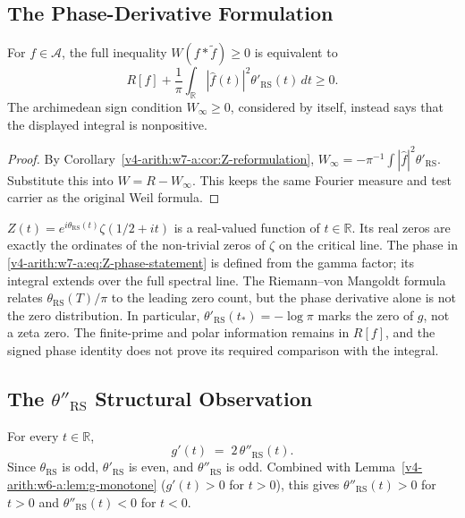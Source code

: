 \subsection{The Phase-Derivative Formulation}
\label{v4-arith:w7-a:Z-reformulation:phase}
\begin{theorem}
\label{v4-arith:w7-a:thm:Z-phase-reformulation}
For \(f\in\mathscr A\), the full inequality
\(W(f*\widetilde f)\ge0\) is equivalent to
\begin{equation}
\label{v4-arith:w7-a:eq:Z-phase-statement}
 R[f]+\frac1\pi\int_{\mathbb R}|\widehat f(t)|^2
          \theta'_{\mathrm{RS}}(t)\,dt\ge0.
\end{equation}
The archimedean sign condition \(W_\infty\ge0\), considered by
itself, instead says that the displayed integral is nonpositive.
\end{theorem}
\begin{proof}
By Corollary~\ref{v4-arith:w7-a:cor:Z-reformulation},
\(W_\infty=-\pi^{-1}\int|\widehat f|^2\theta'_{\mathrm{RS}}\).
Substitute this into \(W=R-W_\infty\). This keeps the same Fourier
measure and test carrier as the original Weil formula.
\end{proof}

\begin{remark}
\label{v4-arith:w7-a:rem:Z-zeros}
\(Z(t)=e^{i\theta_{\mathrm{RS}}(t)}\zeta(1/2+it)\) is a real-valued
function of \(t\in\mathbb{R}\). Its real zeros are exactly the
ordinates of the non-trivial zeros of \(\zeta\) on the critical line.
The phase in \eqref{v4-arith:w7-a:eq:Z-phase-statement} is defined
from the gamma factor; its integral extends over the full spectral
line. The Riemann--von Mangoldt formula relates
\(\theta_{\mathrm{RS}}(T)/\pi\) to the leading zero count, but the
phase derivative alone is not the zero distribution. In particular,
\(\theta'_{\mathrm{RS}}(t_*)=-\log\pi\) marks the zero of \(g\),
not a zeta zero. The finite-prime and polar information remains in
\(R[f]\), and the signed phase identity does not prove its required
comparison with the integral.
\end{remark}

\subsection{The \(\theta''_{\mathrm{RS}}\) Structural Observation}
\label{v4-arith:w7-a:Z-reformulation:theta-second-deriv}

\begin{proposition}
\label{v4-arith:w7-a:prop:g-prime-via-theta}
For every \(t\in\mathbb{R}\),
\begin{equation}
\label{v4-arith:w7-a:eq:g-prime-theta-second}
g'(t)\;=\;2\,\theta''_{\mathrm{RS}}(t).
\end{equation}
Since \(\theta_{\mathrm{RS}}\) is odd, \(\theta'_{\mathrm{RS}}\) is
even, and \(\theta''_{\mathrm{RS}}\) is odd. Combined with
Lemma~\ref{v4-arith:w6-a:lem:g-monotone} (\(g'(t)>0\) for \(t>0\)), this gives
\(\theta''_{\mathrm{RS}}(t)>0\) for \(t>0\) and \(\theta''_{\mathrm{RS}}(t)<0\)
for \(t<0\).
\end{proposition}


